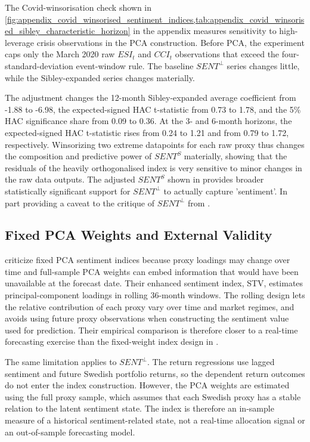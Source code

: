 \documentclass[11pt]{article}
\newcommand{\var}[1]{\ensuremath{#1}}
\begin{document}
The Covid-winsorisation check shown in \cref{fig:appendix_covid_winsorised_sentiment_indices,tab:appendix_covid_winsorised_sibley_characteristic_horizon} in the appendix measures sensitivity to high-leverage crisis observations in the PCA construction. Before PCA, the experiment caps only the March 2020 raw \var{ESI_t} and \var{CCI_t} observations that exceed the four-standard-deviation event-window rule. The baseline \var{SENT^{\perp}} series changes little, while the Sibley-expanded series changes materially. 

The adjustment changes the 12-month Sibley-expanded average coefficient from -1.88 to -6.98, the expected-signed HAC t-statistic from 0.73 to 1.78, and the 5\% HAC significance share from 0.09 to 0.36. At the 3- and 6-month horizons, the expected-signed HAC t-statistic rises from 0.24 to 1.21 and from 0.79 to 1.72, respectively. Winsorizing two extreme datapoints for each raw proxy thus changes the composition and predictive power of \var{SENT^{S}} materially, showing that the residuals of the heavily orthogonalised index is very sensitive to minor changes in the raw data outputs. The adjusted \var{SENT^{S}} shown in  provides broader statistically significant support for \var{SENT^{\perp}} to actually capture 'sentiment'. In part providing a caveat to the critique of \var{SENT^{\perp}} from \citep{sibley2012sentimental}.

\subsection{Fixed PCA Weights and External Validity}
\citet{ung2024enhanced} criticize fixed PCA sentiment indices because proxy loadings may change over time and full-sample PCA weights can embed information that would have been unavailable at the forecast date. Their enhanced sentiment index, STV, estimates principal-component loadings in rolling 36-month windows. The rolling design lets the relative contribution of each proxy vary over time and market regimes, and avoids using future proxy observations when constructing the sentiment value used for prediction. Their empirical comparison is therefore closer to a real-time forecasting exercise than the fixed-weight index design in \citet{baker2006sentiment}.

The same limitation applies to \var{SENT^{\perp}}. The return regressions use lagged sentiment and future Swedish portfolio returns, so the dependent return outcomes do not enter the index construction. However, the PCA weights are estimated using the full proxy sample, which assumes that each Swedish proxy has a stable relation to the latent sentiment state. The index is therefore an in-sample measure of a historical sentiment-related state, not a real-time allocation signal or an out-of-sample forecasting model. 
\end{document}
